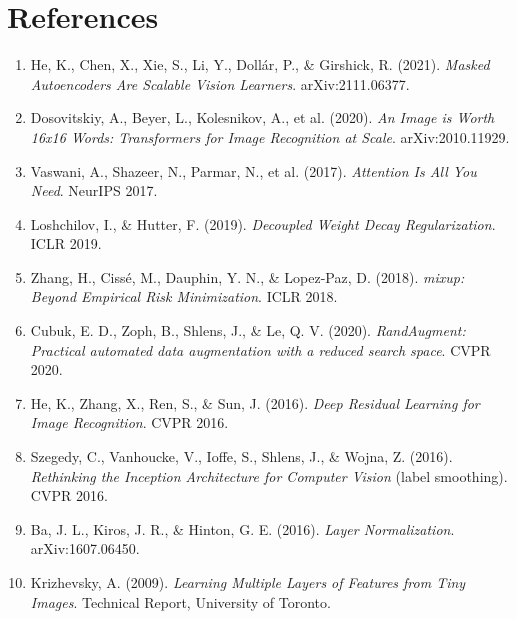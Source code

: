 \documentclass[12pt, a4paper]{report}
\begin{document}
\chapter*{References}

\begin{enumerate}
    \item He, K., Chen, X., Xie, S., Li, Y., Doll\'{a}r, P., \& Girshick, R. (2021). \textit{Masked Autoencoders Are Scalable Vision Learners}. arXiv:2111.06377.

    \item Dosovitskiy, A., Beyer, L., Kolesnikov, A., et al. (2020). \textit{An Image is Worth 16x16 Words: Transformers for Image Recognition at Scale}. arXiv:2010.11929.

    \item Vaswani, A., Shazeer, N., Parmar, N., et al. (2017). \textit{Attention Is All You Need}. NeurIPS 2017.

    \item Loshchilov, I., \& Hutter, F. (2019). \textit{Decoupled Weight Decay Regularization}. ICLR 2019.

    \item Zhang, H., Ciss\'{e}, M., Dauphin, Y. N., \& Lopez-Paz, D. (2018). \textit{mixup: Beyond Empirical Risk Minimization}. ICLR 2018.

    \item Cubuk, E. D., Zoph, B., Shlens, J., \& Le, Q. V. (2020). \textit{RandAugment: Practical automated data augmentation with a reduced search space}. CVPR 2020.

    \item He, K., Zhang, X., Ren, S., \& Sun, J. (2016). \textit{Deep Residual Learning for Image Recognition}. CVPR 2016.

    \item Szegedy, C., Vanhoucke, V., Ioffe, S., Shlens, J., \& Wojna, Z. (2016). \textit{Rethinking the Inception Architecture for Computer Vision} (label smoothing). CVPR 2016.

    \item Ba, J. L., Kiros, J. R., \& Hinton, G. E. (2016). \textit{Layer Normalization}. arXiv:1607.06450.

    \item Krizhevsky, A. (2009). \textit{Learning Multiple Layers of Features from Tiny Images}. Technical Report, University of Toronto.
\end{enumerate}
\end{document}
